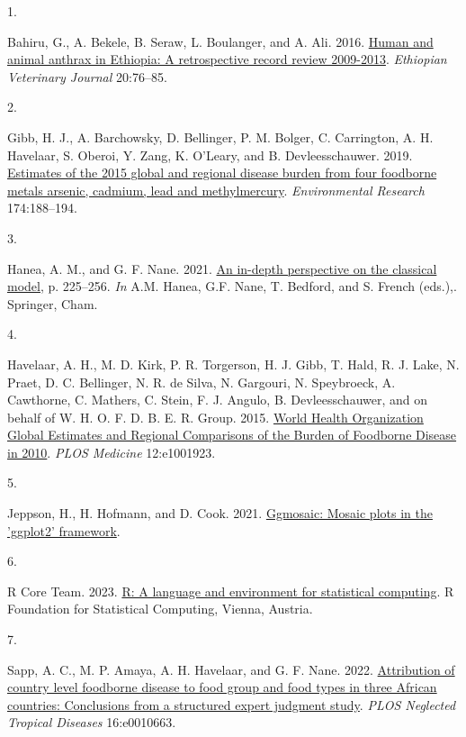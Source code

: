 \documentclass[
  letterpaper,
  DIV=11,
  numbers=noendperiod]{scrartcl}
\newlength{\cslhangindent}
\newlength{\csllabelwidth}
\newenvironment{CSLReferences}[2] %
 {\begin{list}{}{%
  \setlength{\itemindent}{0pt}
  \setlength{\leftmargin}{0pt}
  \setlength{\parsep}{0pt}
  \ifodd #1
   \setlength{\leftmargin}{\cslhangindent}
   \setlength{\itemindent}{-1\cslhangindent}
  \fi
  \setlength{\itemsep}{#2\baselineskip}}}
 {\end{list}}
\newcommand{\CSLLeftMargin}[1]{\parbox[t]{\csllabelwidth}{\strut#1\strut}}
\newcommand{\CSLRightInline}[1]{\parbox[t]{\linewidth - \csllabelwidth}{\strut#1\strut}}
\begin{document}
\label{refs}
\begin{CSLReferences}{0}{0}
\CSLLeftMargin{1. }%
\CSLRightInline{Bahiru, G., A. Bekele, B. Seraw, L. Boulanger, and A.
Ali. 2016. \href{https://doi.org/10.4314/evj.v20i2.6}{Human and animal
anthrax in Ethiopia: A retrospective record review 2009-2013}.
\emph{Ethiopian Veterinary Journal} 20:76--85.}

\CSLLeftMargin{2. }%
\CSLRightInline{Gibb, H. J., A. Barchowsky, D. Bellinger, P. M. Bolger,
C. Carrington, A. H. Havelaar, S. Oberoi, Y. Zang, K. O'Leary, and B.
Devleesschauwer. 2019.
\href{https://doi.org/10.1016/j.envres.2018.12.062}{Estimates of the
2015 global and regional disease burden from four foodborne metals
{\textendash} arsenic, cadmium, lead and methylmercury}.
\emph{Environmental Research} 174:188--194.}

\CSLLeftMargin{3. }%
\CSLRightInline{Hanea, A. M., and G. F. Nane. 2021.
\href{https://doi.org/10.1007/978-3-030-46474-5_10}{An in-depth
perspective on the classical model}, p. 225--256. \emph{In} A.M. Hanea,
G.F. Nane, T. Bedford, and S. French (eds.),. Springer, Cham.}

\CSLLeftMargin{4. }%
\CSLRightInline{Havelaar, A. H., M. D. Kirk, P. R. Torgerson, H. J.
Gibb, T. Hald, R. J. Lake, N. Praet, D. C. Bellinger, N. R. de Silva, N.
Gargouri, N. Speybroeck, A. Cawthorne, C. Mathers, C. Stein, F. J.
Angulo, B. Devleesschauwer, and on behalf of W. H. O. F. D. B. E. R.
Group. 2015. \href{https://doi.org/10.1371/journal.pmed.1001923}{World
Health Organization Global Estimates and Regional Comparisons of the
Burden of Foodborne Disease in 2010}. \emph{PLOS Medicine} 12:e1001923.}

\CSLLeftMargin{5. }%
\CSLRightInline{Jeppson, H., H. Hofmann, and D. Cook. 2021.
\href{https://CRAN.R-project.org/package=ggmosaic}{Ggmosaic: Mosaic
plots in the 'ggplot2' framework}.}

\CSLLeftMargin{6. }%
\CSLRightInline{R Core Team. 2023. \href{https://www.R-project.org/}{R:
A language and environment for statistical computing}. R Foundation for
Statistical Computing, Vienna, Austria.}

\CSLLeftMargin{7. }%
\CSLRightInline{Sapp, A. C., M. P. Amaya, A. H. Havelaar, and G. F.
Nane. 2022.
\href{https://doi.org/10.1371/journal.pntd.0010663}{Attribution of
country level foodborne disease to food group and food types in three
African countries: Conclusions from a structured expert judgment study}.
\emph{PLOS Neglected Tropical Diseases} 16:e0010663.}


\end{CSLReferences}
\end{document}
